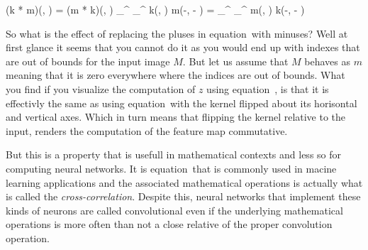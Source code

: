 \startplaceformula[reference=conv-commute]
\startformula
\startmathalignment
\NC (k * m)(\color[red]{x}, \color[red]{y}) \NC = (m * k)(\color[blue]{x}, \color[blue]{y}) \NR
\NC \sum_{\color[blue]{x}}^{} \sum_{\color[blue]{y}}^{} k(\color[blue]{x}, \color[blue]{y}) \cdot m(\color[red]{x}-\color[blue]{x}, \color[red]{y} - \color[blue]{y}) \NC
= \sum_{\color[red]{x}}^{} \sum_{\color[red]{y}}^{} m(\color[red]{x}, \color[red]{y}) \cdot k(\color[blue]{x}-\color[red]{x}, \color[blue]{y} - \color[red]{y}) \NR
\stopmathalignment
\stopformula
\stopplaceformula

\indentation
So what is the effect of replacing the pluses in equation~ with minuses?
Well at first glance it seems that you cannot do it as you would end up with indexes that are out of bounds for the input image $M$.
But let us assume that $M$ behaves as $m$ meaning that it is zero everywhere where the indices are out of bounds.
What you find if you visualize the computation of $z$ using equation~, is that it is effectivly the same as using equation~ with the kernel flipped about its horisontal and vertical axes.
Which in turn means that flipping the kernel relative to the input, renders the computation of the feature map commutative.

But this is a property that is usefull in mathematical contexts and less so for computing neural networks.
It is equation~ that is commonly used in macine learning applications and the associated mathematical operations is actually what is called the {\em cross-correlation}.
Despite this, neural networks that implement these kinds of neurons are called convolutional even if the underlying mathematical operations is more often than not a close relative of the proper convolution operation.
